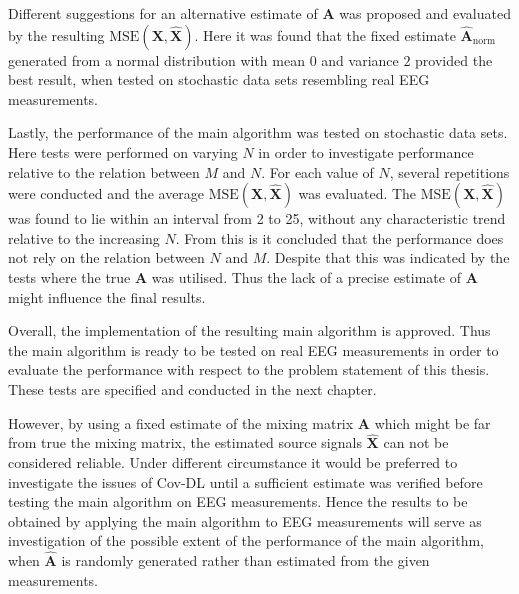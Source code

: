 Different suggestions for an alternative estimate of $\mathbf{A}$ was proposed and evaluated by the resulting $\text{MSE}(\mathbf{X}, \hat{\mathbf{X}})$. 
Here it was found that the fixed estimate $\hat{\mathbf{A}}_{\text{norm}}$ generated from a normal distribution with mean $0$ and variance $2$ provided the best result, when tested on stochastic data sets resembling real EEG measurements. 

Lastly, the performance of the main algorithm was tested on stochastic data sets. 
Here tests were performed on varying $N$ in order to investigate performance relative to the relation between $M$ and $N$. 
For each value of $N$, several repetitions were conducted and the average $\text{MSE}(\mathbf{X}, \hat{\mathbf{X}})$ was evaluated. 
The $\text{MSE}(\mathbf{X}, \hat{\mathbf{X}})$ was found to lie within an interval from 2 to 25, without any characteristic trend relative to the increasing $N$. 
From this is it concluded that the performance does not rely on the relation between $N$ and $M$. 
Despite that this was indicated by the tests where the true $\mathbf{A}$ was utilised. 
Thus the lack of a precise estimate of $\mathbf{A}$ might influence the final results. 

Overall, the implementation of the resulting main algorithm is approved. 
Thus the main algorithm is ready to be tested on real EEG measurements in order to evaluate the performance with respect to the problem statement of this thesis. These tests are specified and conducted in the next chapter. 

However, by using a fixed estimate of the mixing matrix $\textbf{A}$ which might be far from true the mixing matrix, the estimated source signals $\hat{\textbf{X}}$ can not be considered reliable. Under different circumstance it would be preferred to investigate the issues of Cov-DL until a sufficient estimate was verified before testing the main algorithm on EEG measurements.
Hence the results to be obtained by applying the main algorithm to EEG measurements will serve as investigation of the possible extent of the performance of the main algorithm, when $\hat{\textbf{A}}$ is randomly generated rather than estimated from the given measurements.       